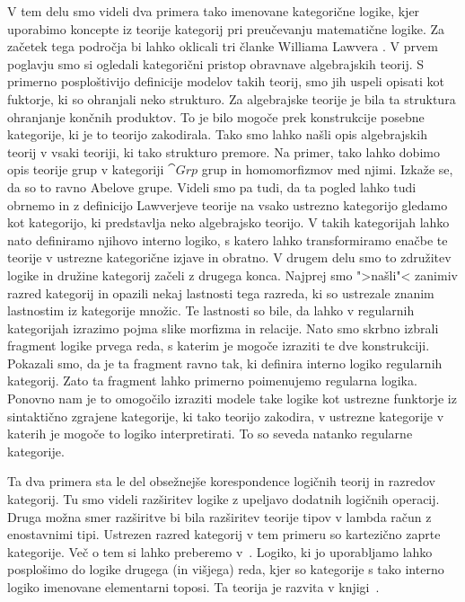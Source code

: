 \documentclass[../kategoricna_logika.tex]{subfiles}
\begin{document}
V tem delu smo videli dva primera tako imenovane kategorične logike, kjer uporabimo
koncepte iz teorije kategorij pri preučevanju matematične logike.
Za začetek tega področja bi lahko oklicali tri članke Williama Lawvera \cite{lawvere1963functorial,lawvere1964elementary,lawvere1971quantifiers}.
V prvem poglavju smo si ogledali kategorični pristop obravnave algebrajskih teorij.
S primerno posploštivijo definicije modelov takih teorij, smo jih uspeli opisati
kot fuktorje, ki so ohranjali neko strukturo.
Za algebrajske teorije je bila ta struktura ohranjanje končnih produktov.
To je bilo mogoče prek konstrukcije posebne kategorije, ki je to teorijo zakodirala.
Tako smo lahko našli opis algebrajskih teorij v vsaki teoriji, ki tako strukturo premore.
Na primer, tako lahko dobimo opis teorije grup v kategoriji $\cat{Grp}$ grup in
homomorfizmov med njimi. Izkaže se, da so to ravno Abelove grupe.
Videli smo pa tudi, da ta pogled lahko tudi obrnemo in z definicijo Lawverjeve teorije
na vsako ustrezno kategorijo gledamo kot kategorijo, ki predstavlja neko algebrajsko
teorijo. V takih kategorijah lahko nato definiramo njihovo interno logiko, s katero
lahko transformiramo enačbe te teorije v ustrezne kategorične izjave in obratno.
V drugem delu smo to združitev logike in družine kategorij začeli z drugega konca.
Najprej smo ">našli"< zanimiv razred kategorij in opazili nekaj lastnosti tega razreda,
ki so ustrezale znanim lastnostim iz kategorije množic. Te lastnosti so bile, da lahko
v regularnih kategorijah izrazimo pojma slike morfizma in relacije. Nato smo skrbno
izbrali fragment logike prvega reda, s katerim je mogoče izraziti te dve konstrukciji.
Pokazali smo, da je ta fragment ravno tak, ki definira interno logiko regularnih kategorij.
Zato ta fragment lahko primerno poimenujemo regularna logika.
Ponovno nam je to omogočilo izraziti modele take logike kot ustrezne funktorje iz sintaktično
zgrajene kategorije, ki tako teorijo zakodira, v ustrezne kategorije v katerih je
mogoče to logiko interpretirati. To so seveda natanko regularne kategorije.

Ta dva primera sta le del obsežnejše korespondence logičnih teorij in razredov kategorij.
Tu smo videli razširitev logike z upeljavo dodatnih logičnih operacij. Druga možna smer
razširitve bi bila razširitev teorije tipov v lambda račun z enostavnimi tipi. Ustrezen
razred kategorij v tem primeru so kartezično zaprte kategorije. Več o tem si lahko preberemo
v~\cite{seely1984locally}. 
Logiko, ki jo uporabljamo lahko posplošimo do logike drugega (in višjega) reda, kjer so
kategorije s tako interno logiko imenovane elementarni toposi. Ta teorija je razvita v
knjigi~\cite{TJohnstone2002-TJOSOA-2}.
\end{document}
